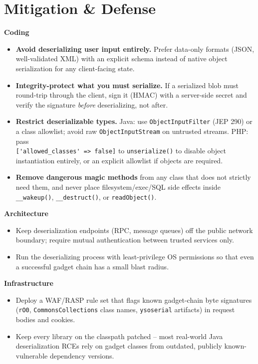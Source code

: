 \documentclass[11pt]{article}
\begin{document}
\section{Mitigation \& Defense}
\textbf{Coding}
\begin{itemize}
    \item \textbf{Avoid deserializing user input entirely.} Prefer data-only formats (JSON, well-validated XML) with an explicit schema instead of native object serialization for any client-facing state.
    \item \textbf{Integrity-protect what you must serialize.} If a serialized blob must round-trip through the client, sign it (HMAC) with a server-side secret and verify the signature \textit{before} deserializing, not after.
    \item \textbf{Restrict deserializable types.} Java: use \texttt{ObjectInputFilter} (JEP 290) or a class allowlist; avoid raw \texttt{ObjectInputStream} on untrusted streams. PHP: pass \\ \verb|['allowed_classes' => false]| to \verb|unserialize()| to disable object instantiation entirely, or an explicit allowlist if objects are required.
    \item \textbf{Remove dangerous magic methods} from any class that does not strictly need them, and never place filesystem/exec/SQL side effects inside \verb|__wakeup()|, \verb|__destruct()|, or \texttt{readObject()}.
\end{itemize}
\textbf{Architecture}
\begin{itemize}
    \item Keep deserialization endpoints (RPC, message queues) off the public network boundary; require mutual authentication between trusted services only.
    \item Run the deserializing process with least-privilege OS permissions so that even a successful gadget chain has a small blast radius.
\end{itemize}
\textbf{Infrastructure}
\begin{itemize}
    \item Deploy a WAF/RASP rule set that flags known gadget-chain byte signatures (\texttt{rO0}, \texttt{CommonsCollections} class names, \texttt{ysoserial} artifacts) in request bodies and cookies.
    \item Keep every library on the classpath patched -- most real-world Java deserialization RCEs rely on gadget classes from outdated, publicly known-vulnerable dependency versions.
\end{itemize}
\end{document}
